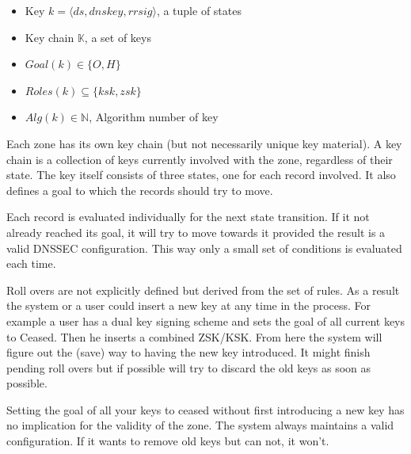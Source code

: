 \documentclass[twoside,english]{paper}
\begin{document}
\begin{itemize}
	\item Key $k = \langle ds, dnskey, rrsig\rangle$, a tuple of states
	\item Key chain $\mathbb{K}$, a set of keys
	\item $Goal(k) \in \{O, H\}$
	\item $Roles(k) \subseteq \{ksk, zsk\}$
	\item $Alg(k) \in \mathbb{N}$, Algorithm number of key
\end{itemize}

Each zone has its own key chain (but not necessarily unique key 
material). A key chain is a collection of keys currently involved with 
the zone, regardless of their state. The key itself consists of three 
states, one for each record involved. It also defines a goal to which
the records should try to move.

Each record is evaluated individually for the next state transition. 
If it not already reached its goal, it will try to move towards it 
provided the result is a valid DNSSEC configuration. This way only a 
small set of conditions is evaluated each time. 

Roll overs are not explicitly defined but derived from the 
set of rules. As a result the system or a user could insert a new key 
at any time in the process. For example a user has a dual key signing 
scheme and sets the goal of all current keys to Ceased. Then he inserts
a combined ZSK/KSK. From here the system will figure out the (save) way
to having the new key introduced. It might finish pending roll overs 
but if possible will try to discard the old keys as soon as possible.

Setting the goal of all your keys to ceased without first introducing 
a new key has no implication for the validity of the zone. The system 
always maintains a valid configuration. If it wants to remove old keys 
but can not, it won't.

\end{document}
